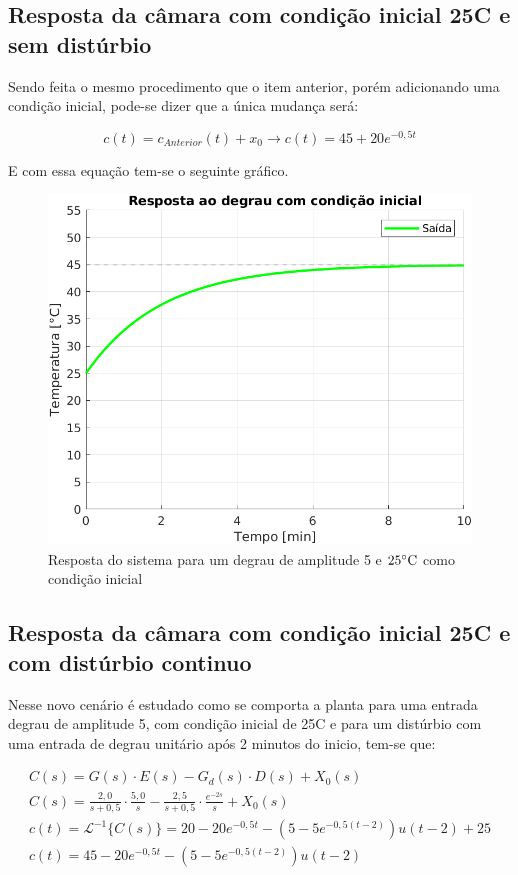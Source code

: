 \documentclass[a4paper,12pt]{article}
\begin{document}
	\subsection{Resposta da câmara com condição inicial 25\degree C e sem distúrbio}
		Sendo feita o mesmo procedimento que o item anterior, porém adicionando uma condição inicial, pode-se dizer que a única mudança será:
		
		\begin{equation}
			c(t) = c_{Anterior}(t) + x_0 \rightarrow c(t) = 45 + 20e^{-0,5t}
		\end{equation}
	
		E com essa equação tem-se o seguinte gráfico.
		
		\begin{figure}[H]
			\centering
			\includegraphics[width=0.5\linewidth]{images/respc.png}
			\caption{Resposta do sistema para um degrau de amplitude 5 e $25 \celsius$ como condição inicial}
			\label{fig:resposta_c}
		\end{figure}
	
	\subsection{Resposta da câmara com condição inicial 25\degree C e com distúrbio continuo}
		Nesse novo cenário é estudado como se comporta a planta para uma entrada degrau de amplitude 5, com condição inicial de 25\degree C e para um distúrbio com uma entrada de degrau unitário após 2 minutos do inicio, tem-se que:
		
		\begin{gather}
			C(s) = G(s) \cdot E(s) - G_d(s) \cdot D(s)  + X_0(s)\\[20pt]
			C(s) = \frac{2,0}{s+0,5} \cdot \frac{5,0}{s} - \frac{2,5}{s+0,5} \cdot \frac{e^{-2s}}{s} + X_0(s) \\[20pt]
			c(t) = \mathcal{L}^{-1} \{ C(s) \} = 20 - 20e^{-0,5t} - (5 - 5e^{-0,5(t-2)})u(t-2) + 25 \\[20pt]
			c(t) = 45 - 20e^{-0,5t} - (5 - 5e^{-0,5(t-2)})u(t-2)
		\end{gather}
	
\end{document}

